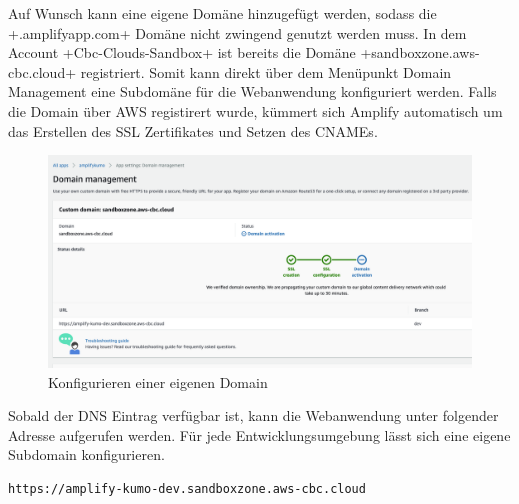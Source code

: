 Auf Wunsch kann eine eigene Domäne hinzugefügt werden, sodass die \spverb+.amplifyapp.com+ Domäne nicht zwingend genutzt werden muss.
In dem Account \spverb+Cbc-Clouds-Sandbox+ ist bereits die Domäne \spverb+sandboxzone.aws-cbc.cloud+ registriert.
Somit kann direkt über dem Menüpunkt \glqq Domain Management\grqq{} eine Subdomäne für die Webanwendung konfiguriert werden.
Falls die Domain über AWS registirert wurde, kümmert sich Amplify automatisch um das Erstellen des SSL Zertifikates und Setzen des CNAMEs.

\begin{figure}[htbp]
    \centering
    \includegraphics[width=1.0\textwidth]{50-Implementierung/SSL.png}
    \caption{Konfigurieren einer eigenen Domain}
    \label{fig:meine-grafik}
\end{figure}

Sobald der DNS Eintrag verfügbar ist, kann die Webanwendung unter folgender Adresse aufgerufen werden.
Für jede Entwicklungsumgebung lässt sich eine eigene Subdomain konfigurieren.
\\
\begin{lstlisting}[basicstyle=\ttfamily\small, breaklines=true , frame = single, backgroundcolor=\color{flashwhite} ]
https://amplify-kumo-dev.sandboxzone.aws-cbc.cloud
\end{lstlisting}
